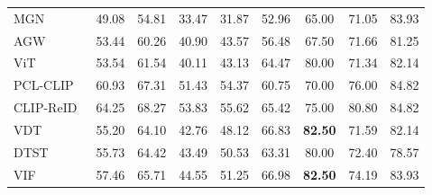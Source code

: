 \documentclass[runningheads]{llncs}
\makeatletter
\let\leaderboards@table\table
\let\leaderboards@endtable\endtable
\renewenvironment{table}[1][]{\leaderboards@table[H]}{\leaderboards@endtable}
\makeatother
\begin{document}
\begin{table}[t]
\begin{tabular}{lcccccccc}
    MGN~\cite{wang2018learning}        & 49.08                               & 54.81                  & 33.47                   & 31.87                  & 52.96                   & 65.00                  & 71.05                   & 83.93                  \\
    AGW~\cite{ye2021deep}              & 53.44                               & 60.26                  & 40.90                   & 43.57                  & 56.48                   & 67.50                  & 71.66                   & 81.25                  \\
    \Xhline{0.6pt}
    ViT~\cite{dosovitskiyimage}        & 53.54                               & 61.54                  & 40.11                   & 43.13                  & 64.47                   & 80.00                  & 71.34                   & 82.14                  \\
    PCL-CLIP~\cite{li2023prototypical} & 60.93                               & 67.31                  & 51.43                   & 54.37                  & 60.75                   & 70.00                  & 76.00                   & 84.82                  \\
    CLIP-ReID~\cite{li2023clip}        & 64.25                               & 68.27                  & 53.83                   & 55.62                  & 65.42                   & 75.00                  & 80.80                   & 84.82                  \\
    \Xhline{0.6pt}
    VDT~\cite{zhang2024view}           & 55.20                               & 64.10                  & 42.76                   & 48.12                  & 66.83                   & \textbf{82.50}         & 71.59                   & 82.14                  \\
    DTST~\cite{wang2024dynamic}        & 55.73                               & 64.42                  & 43.49                   & 50.53                  & 63.31                   & 80.00                  & 72.40                   & 78.57                  \\
    VIF~\cite{khalid2025bridging}      & 57.46                               & 65.71                  & 44.55                   & 51.25                  & 66.98                   & \textbf{82.50}         & 74.19                   & 83.93                  \\

\end{tabular}
\end{table}
\end{document}
